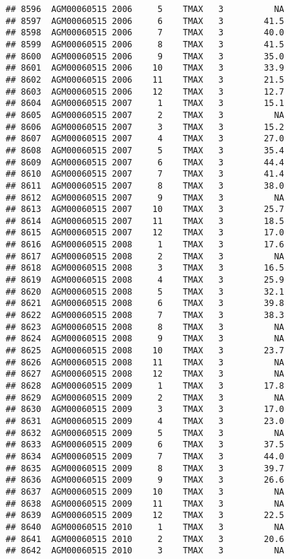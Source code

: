 \documentclass{article}\usepackage[]{graphicx}\usepackage[]{color}
\makeatletter
\newenvironment{kframe}{%
 \def\at@end@of@kframe{}%
 \ifinner\ifhmode%
  \def\at@end@of@kframe{\end{minipage}}%
  \begin{minipage}{\columnwidth}%
 \fi\fi%
 \def\FrameCommand##1{\hskip\@totalleftmargin \hskip-\fboxsep
 \colorbox{shadecolor}{##1}\hskip-\fboxsep
     \hskip-\linewidth \hskip-\@totalleftmargin \hskip\columnwidth}%
 \MakeFramed {\advance\hsize-\width
   \@totalleftmargin\z@ \linewidth\hsize
   \@setminipage}}%
 {\par\unskip\endMakeFramed%
 \at@end@of@kframe}
\newenvironment{knitrout}{}{} %
\makeatother
\begin{document}
\begin{knitrout}
\begin{kframe}
\begin{verbatim}
## 8596  AGM00060515 2006     5    TMAX   3          NA
## 8597  AGM00060515 2006     6    TMAX   3        41.5
## 8598  AGM00060515 2006     7    TMAX   3        40.0
## 8599  AGM00060515 2006     8    TMAX   3        41.5
## 8600  AGM00060515 2006     9    TMAX   3        35.0
## 8601  AGM00060515 2006    10    TMAX   3        33.9
## 8602  AGM00060515 2006    11    TMAX   3        21.5
## 8603  AGM00060515 2006    12    TMAX   3        12.7
## 8604  AGM00060515 2007     1    TMAX   3        15.1
## 8605  AGM00060515 2007     2    TMAX   3          NA
## 8606  AGM00060515 2007     3    TMAX   3        15.2
## 8607  AGM00060515 2007     4    TMAX   3        27.0
## 8608  AGM00060515 2007     5    TMAX   3        35.4
## 8609  AGM00060515 2007     6    TMAX   3        44.4
## 8610  AGM00060515 2007     7    TMAX   3        41.4
## 8611  AGM00060515 2007     8    TMAX   3        38.0
## 8612  AGM00060515 2007     9    TMAX   3          NA
## 8613  AGM00060515 2007    10    TMAX   3        25.7
## 8614  AGM00060515 2007    11    TMAX   3        18.5
## 8615  AGM00060515 2007    12    TMAX   3        17.0
## 8616  AGM00060515 2008     1    TMAX   3        17.6
## 8617  AGM00060515 2008     2    TMAX   3          NA
## 8618  AGM00060515 2008     3    TMAX   3        16.5
## 8619  AGM00060515 2008     4    TMAX   3        25.9
## 8620  AGM00060515 2008     5    TMAX   3        32.1
## 8621  AGM00060515 2008     6    TMAX   3        39.8
## 8622  AGM00060515 2008     7    TMAX   3        38.3
## 8623  AGM00060515 2008     8    TMAX   3          NA
## 8624  AGM00060515 2008     9    TMAX   3          NA
## 8625  AGM00060515 2008    10    TMAX   3        23.7
## 8626  AGM00060515 2008    11    TMAX   3          NA
## 8627  AGM00060515 2008    12    TMAX   3          NA
## 8628  AGM00060515 2009     1    TMAX   3        17.8
## 8629  AGM00060515 2009     2    TMAX   3          NA
## 8630  AGM00060515 2009     3    TMAX   3        17.0
## 8631  AGM00060515 2009     4    TMAX   3        23.0
## 8632  AGM00060515 2009     5    TMAX   3          NA
## 8633  AGM00060515 2009     6    TMAX   3        37.5
## 8634  AGM00060515 2009     7    TMAX   3        44.0
## 8635  AGM00060515 2009     8    TMAX   3        39.7
## 8636  AGM00060515 2009     9    TMAX   3        26.6
## 8637  AGM00060515 2009    10    TMAX   3          NA
## 8638  AGM00060515 2009    11    TMAX   3          NA
## 8639  AGM00060515 2009    12    TMAX   3        22.5
## 8640  AGM00060515 2010     1    TMAX   3          NA
## 8641  AGM00060515 2010     2    TMAX   3        20.6
## 8642  AGM00060515 2010     3    TMAX   3          NA

\end{verbatim}
\end{kframe}
\end{knitrout}
\end{document}
